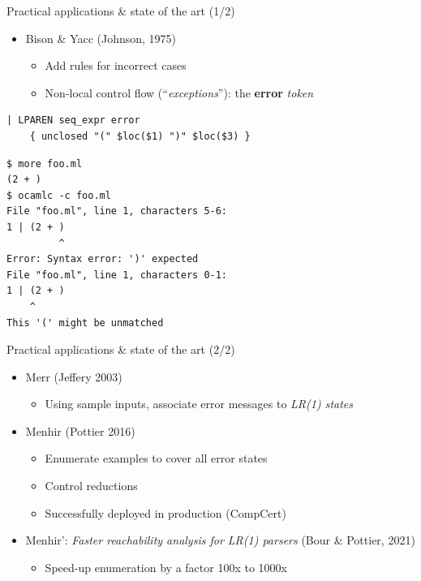 \documentclass[aspectratio=169]{beamer}          %
\begin{document}
\begin{frame}[fragile]{Practical applications \& state of the art (1/2)}
  \begin{itemize}
    \item Bison \& Yacc (Johnson, 1975)
      \begin{itemize}
      \item Add rules for incorrect cases
      \item Non-local control flow (``{\em exceptions}''): the \textbf{error} {\em token}
    \end{itemize}
  \end{itemize}
\pause
\small
\begin{verbatim}
| LPAREN seq_expr error
    { unclosed "(" $loc($1) ")" $loc($3) }
\end{verbatim}
\pause
\begin{verbatim}
$ more foo.ml
(2 + )
$ ocamlc -c foo.ml
File "foo.ml", line 1, characters 5-6:
1 | (2 + )
         ^
Error: Syntax error: ')' expected
File "foo.ml", line 1, characters 0-1:
1 | (2 + )
    ^
This '(' might be unmatched
\end{verbatim}
\end{frame}

\begin{frame}[fragile]{Practical applications \& state of the art (2/2)}
  \begin{itemize}
    \item Merr (Jeffery 2003)
      \begin{itemize}
        \item Using sample inputs, associate error messages to {\em LR(1) states}
      \end{itemize}
    \pause
    \item Menhir (Pottier 2016)
      \begin{itemize}
        \item Enumerate examples to cover all error states
        \item Control reductions 
        \item Successfully deployed in production (CompCert)
      \end{itemize}
    \pause
    \pause
    \item Menhir': {\em Faster reachability analysis for LR(1) parsers} (Bour \& Pottier, 2021)
      \begin{itemize}
        \item Speed-up enumeration by a factor 100x to 1000x
      \end{itemize}
  \end{itemize}
\end{frame}
\end{document}
